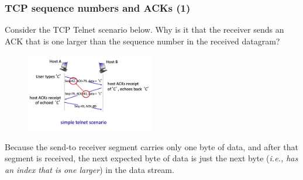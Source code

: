     \subsubsection*{TCP sequence numbers and ACKs (1)}
    \noindent Consider the TCP Telnet scenario below. Why is it that the receiver sends an ACK that is one larger than the sequence number in the received datagram?
    \begin{figure}[H]
        \centering
        \includegraphics[width=0.5\textwidth]{img/3.5.3.jpg}
    \end{figure}
    \noindent Because the send-to receiver segment carries only one byte of data, and after that segment is received, the next expected byte of data is just the next
    byte (\textit{i.e., has an index that is one larger}) in the data stream.

